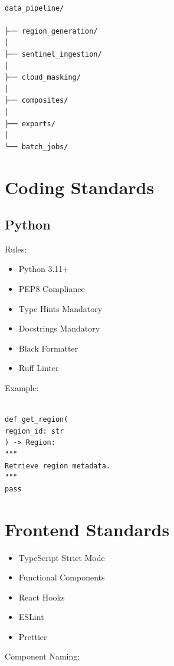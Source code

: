 \documentclass[11pt,a4paper]{article}
\begin{document}
\begin{verbatim}

data_pipeline/

├── region_generation/
│
├── sentinel_ingestion/
│
├── cloud_masking/
│
├── composites/
│
├── exports/
│
└── batch_jobs/

\end{verbatim}

\section{Coding Standards}

\subsection{Python}

Rules:

\begin{itemize}
\item Python 3.11+
\item PEP8 Compliance
\item Type Hints Mandatory
\item Docstrings Mandatory
\item Black Formatter
\item Ruff Linter
\end{itemize}

Example:

\begin{verbatim}

def get_region(
region_id: str
) -> Region:
"""
Retrieve region metadata.
"""
pass

\end{verbatim}

\section{Frontend Standards}

\begin{itemize}
\item TypeScript Strict Mode
\item Functional Components
\item React Hooks
\item ESLint
\item Prettier
\end{itemize}

Component Naming:
\end{document}

